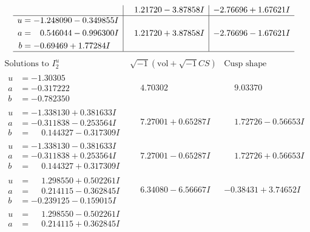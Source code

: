 \documentclass[1p]{elsarticle_modified}
\theoremstyle{definition}
\newcommand{\I}{\sqrt{-1}}
\begin{document}
$$\begin{array}{c|c|c}
 & \phantom{-}1.21720 - 3.87858 I & -2.76696 + 1.67621 I \\ \hline\begin{aligned}
u &= -1.248090 - 0.349855 I \\
a &= \phantom{-}0.546044 - 0.996300 I \\
b &= -0.69469 + 1.77284 I\end{aligned}
 & \phantom{-}1.21720 + 3.87858 I & -2.76696 - 1.67621 I\\
 \hline 
 \end{array}$$\newpage$$\begin{array}{c|c|c}  
\text{Solutions to }I^u_{2}& \I (\text{vol} + \sqrt{-1}CS) & \text{Cusp shape}\\
 \hline 
\begin{aligned}
u &= -1.30305\phantom{ +0.000000I} \\
a &= -0.317222\phantom{ +0.000000I} \\
b &= -0.782350\phantom{ +0.000000I}\end{aligned}
 & \phantom{-}4.70302\phantom{ +0.000000I} & \phantom{-}9.03370\phantom{ +0.000000I} \\ \hline\begin{aligned}
u &= -1.338130 + 0.381633 I \\
a &= -0.311838 - 0.253564 I \\
b &= \phantom{-}0.144327 - 0.317309 I\end{aligned}
 & \phantom{-}7.27001 + 0.65287 I & \phantom{-}1.72726 - 0.56653 I \\ \hline\begin{aligned}
u &= -1.338130 - 0.381633 I \\
a &= -0.311838 + 0.253564 I \\
b &= \phantom{-}0.144327 + 0.317309 I\end{aligned}
 & \phantom{-}7.27001 - 0.65287 I & \phantom{-}1.72726 + 0.56653 I \\ \hline\begin{aligned}
u &= \phantom{-}1.298550 + 0.502261 I \\
a &= \phantom{-}0.214115 - 0.362845 I \\
b &= -0.239125 - 0.159015 I\end{aligned}
 & \phantom{-}6.34080 - 6.56667 I & -0.38431 + 3.74652 I \\ \hline\begin{aligned}
u &= \phantom{-}1.298550 - 0.502261 I \\
a &= \phantom{-}0.214115 + 0.362845 I \\

\end{aligned}
\end{array}$$
\end{document}
